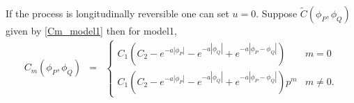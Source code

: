 If the process is longitudinally reversible one can set $u=0$. Suppose $\tilde{C}(\phi_P, \phi_Q)$ given by \ref{Cm_model1} then \Cm for model1,
\begin{eqnarray*}
	C_m(\phi_P, \phi_Q) &=& \left\{ \begin{array}{ll}
	C_1\left(C_2 - e^{-a|\phi_P|} - e^{-a|\phi_Q|} + e^{-a|\phi_P - \phi_Q|}\right)  & m = 0 \\
	C_1\left(C_2 - e^{-a|\phi_P|} - e^{-a|\phi_Q|} + e^{-a|\phi_P - \phi_Q|}\right)p^m & m \ne 0.
	\end{array}
	\right.
\end{eqnarray*}




%
